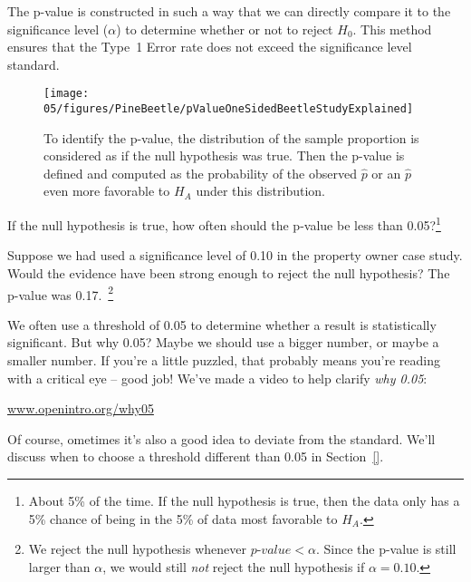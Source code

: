 The p-value is constructed in such a way that we can directly compare it to the significance level ($\alpha$) to determine whether or not to reject $H_0$. This method ensures that the Type~1 Error rate does not exceed the significance level standard.

\begin{figure}[ht]
\centering
\texttt{[image: 05/figures/PineBeetle/pValueOneSidedBeetleStudyExplained]}
\caption{To identify the p-value, the distribution of the sample proportion is considered as if the null hypothesis was true. Then the p-value is defined and computed as the probability of the observed $\hat{p}$ or an $\hat{p}$ even more favorable to $H_A$ under this distribution.}
\label{pValueOneSidedSleepStudyExplained}
\end{figure}

\begin{exercise}
If the null hypothesis is true, how often should the p-value be less than 0.05?\footnote{About 5\% of the time. If the null hypothesis is true, then the data only has a 5\% chance of being in the 5\% of data most favorable to $H_A$.}
\end{exercise}

\begin{exercise}
Suppose we had used a significance level of 0.10 in the property owner case study. Would the evidence have been strong enough to reject the null hypothesis? The p-value was 0.17.~\footnote{We reject the null hypothesis whenever $p$-$value < \alpha$. Since the p-value is still larger than $\alpha$, we would still \emph{not} reject the null hypothesis if $\alpha = 0.10$.}
\end{exercise}

\begin{termBox}{
We often use a threshold of 0.05 to determine whether a result is statistically significant. But why 0.05? Maybe we should use a bigger number, or maybe a smaller number. If you're a little puzzled, that probably means you're reading with a critical eye -- good job! We've made a video to help clarify \emph{why 0.05}:
\begin{center}
\href{http://www.openintro.org/why05}{www.openintro.org/why05}
\end{center}
Of course, ometimes it's also a good idea to deviate from the standard. We'll discuss when to choose a threshold different than 0.05 in Section~\ref{}.\vspace{0.5mm}}
\end{termBox}


